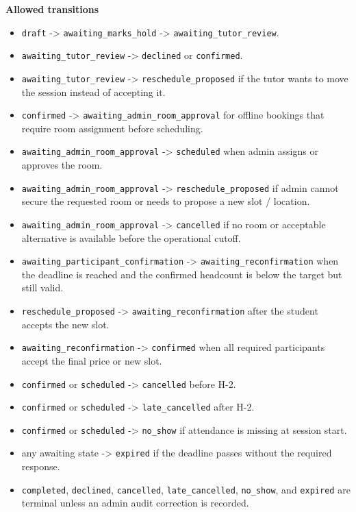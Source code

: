 \documentclass[11pt,a4paper]{article}
\begin{document}
\textbf{Allowed transitions}
\begin{itemize}
	\item \texttt{draft} -> \texttt{awaiting\_marks\_hold} -> \texttt{awaiting\_tutor\_review}.
	\item \texttt{awaiting\_tutor\_review} -> \texttt{declined} or \texttt{confirmed}.
	\item \texttt{awaiting\_tutor\_review} -> \texttt{reschedule\_proposed} if the tutor wants to move the session instead of accepting it.
	\item \texttt{confirmed} -> \texttt{awaiting\_admin\_room\_approval} for offline bookings that require room assignment before scheduling.
	\item \texttt{awaiting\_admin\_room\_approval} -> \texttt{scheduled} when admin assigns or approves the room.
	\item \texttt{awaiting\_admin\_room\_approval} -> \texttt{reschedule\_proposed} if admin cannot secure the requested room or needs to propose a new slot / location.
	\item \texttt{awaiting\_admin\_room\_approval} -> \texttt{cancelled} if no room or acceptable alternative is available before the operational cutoff.
	\item \texttt{awaiting\_participant\_confirmation} -> \texttt{awaiting\_reconfirmation} when the deadline is reached and the confirmed headcount is below the target but still valid.
	\item \texttt{reschedule\_proposed} -> \texttt{awaiting\_reconfirmation} after the student accepts the new slot.
	\item \texttt{awaiting\_reconfirmation} -> \texttt{confirmed} when all required participants accept the final price or new slot.
	\item \texttt{confirmed} or \texttt{scheduled} -> \texttt{cancelled} before H-2.
	\item \texttt{confirmed} or \texttt{scheduled} -> \texttt{late\_cancelled} after H-2.
	\item \texttt{confirmed} or \texttt{scheduled} -> \texttt{no\_show} if attendance is missing at session start.
	\item any awaiting state -> \texttt{expired} if the deadline passes without the required response.
	\item \texttt{completed}, \texttt{declined}, \texttt{cancelled}, \texttt{late\_cancelled}, \texttt{no\_show}, and \texttt{expired} are terminal unless an admin audit correction is recorded.
\end{itemize}
\end{document}
